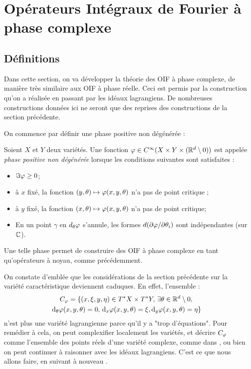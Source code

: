 \section{Opérateurs Intégraux de Fourier à phase complexe}
\subsection{Définitions}
Dans cette section, on va développer la théorie des OIF à phase complexe, de manière très similaire aux OIF à phase réelle. Ceci est permis par la construction qu'on a réalisée en passant par les idéaux lagrangiens. De nombreuses constructions données ici ne seront que des reprises des constructions de la section précédente.

On commence par définir une phase positive non dégénérée :
\begin{defn}
	Soient $X$ et $Y$ deux variétés. Une fonction $\varphi \in C^{\infty}(X\times Y \times (\mathbb{R}^d\setminus 0))$ est appelée \emph{phase positive non dégénérée} lorsque les conditions suivantes sont satisfaites :
	\begin{itemize}
		\item $\Im \varphi \geq 0$;
		\item à $x$ fixé, la fonction $(y,\theta) \mapsto \varphi(x,y,\theta)$ n'a pas de point critique ;
		\item à $y$ fixé, la fonction $(x,\theta) \mapsto \varphi(x,y,\theta)$ n'a pas de point critique; 
		\item En un point $\gamma$ en $d_{\theta}\varphi$ s'annule, les formes $d(\partial \varphi/\partial \theta_i)$ sont indépendantes (sur $\mathbb{C}$).
	\end{itemize}
\end{defn}

Une telle phase permet de construire des OIF à phase complexe en tant qu'opérateurs à noyau, comme précédemment.

On constate d'emblée que les considérations de la section précédente sur la variété caractéristique deviennent caduques. En effet, l'ensemble :
\begin{multline*}
C_{\varphi}=\{(x,\xi,y,\eta) \in T^*X \times T^*Y,\,\exists \theta\in \mathbb{R}^d\setminus 0,\,\\\mathrm{d}_{\theta}\varphi(x,y,\theta)=0,\,\mathrm{d}_x\varphi(x,y,\theta)=\xi, \mathrm{d}_y\varphi(x,y,\theta)=\eta\}
\end{multline*}
n'est plus une variété lagrangienne parce qu'il y a "trop d'équations". Pour remédier à cela, on peut complexifier localement les variétés, et décrire $C_{\varphi}$ comme l'ensemble des points réels d'une variété complexe, comme dans \cite{melin1975fourier}, ou bien on peut continuer à raisonner avec les idéaux lagrangiens. C'est ce que nous allons faire, en suivant à nouveau \cite{hormander1985}.

